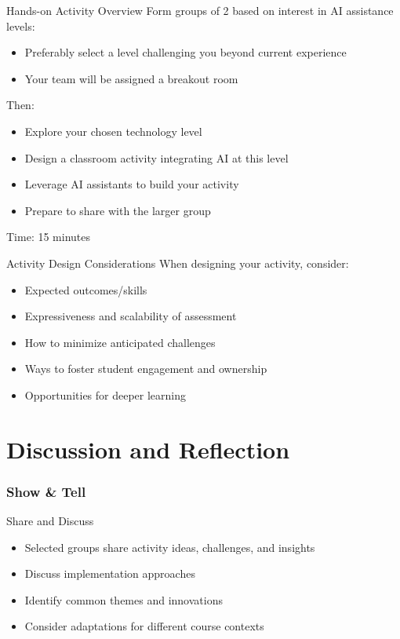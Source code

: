 \documentclass[xcolor=dvipsnames, aspectratio=169]{beamer}
\begin{document}
\begin{frame}{Hands-on Activity Overview}
  Form groups of 2 based on interest in AI assistance levels:
  \begin{itemize}
    \item Preferably select a level challenging you beyond current experience
    \item Your team will be assigned a breakout room
  \end{itemize}
  
  Then:
  \begin{itemize}
    \item Explore your chosen technology level
    \item Design a classroom activity integrating AI at this level
    \item Leverage AI assistants to build your activity
    \item Prepare to share with the larger group
  \end{itemize}
  
  Time: 15 minutes
\end{frame}

\begin{frame}{Activity Design Considerations}
  When designing your activity, consider:
  \begin{itemize}
    \item Expected outcomes/skills
    \item Expressiveness and scalability of assessment
    \item How to minimize anticipated challenges
    \item Ways to foster student engagement and ownership
    \item Opportunities for deeper learning
  \end{itemize}
\end{frame}

\part[Discussion and Reflection]{Discussion and Reflection}
\section{Show \& Tell}

\begin{frame}{Share and Discuss}
  \begin{itemize}
    \item Selected groups share activity ideas, challenges, and insights
    \item Discuss implementation approaches
    \item Identify common themes and innovations
    \item Consider adaptations for different course contexts
  \end{itemize}
\end{frame}
\end{document}
